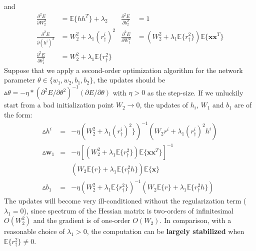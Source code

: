 \begin{comment}
\begin{align*}
\frac{\partial E}{\partial W_2}&=\mathbb{E}\{rh^T\}+\lambda_2W_2 
&\frac{\partial E}{\partial b_2}&=\mathbb{E}\{r\}
&\frac{\partial E}{\partial h^i}&=W_2r^i+\lambda_1(r^i_{\dagger})^2h^i\\
\frac{\partial E}{\partial W_1}&=W_2\mathbb{E}\{r\mathbf{x}^T\}+\lambda_1 \mathbb{E}\{r_{\dagger}^2h\mathbf{x}^T\}
&\frac{\partial E}{\partial b_1}&=W_2\mathbb{E}\{r\}+\lambda_1 \mathbb{E}\{r_{\dagger}^2h\}
\end{align*}
\end{comment}
and
\begin{align*}
\frac{\partial^2 E}{\partial W_2^2}&=\mathbb{E}\{hh^T\}+\lambda_2
&\frac{\partial^2 E}{\partial b_2^2}&=1\\
\frac{\partial^2 E}{\partial (h^i)^2}&=W_2^2+\lambda_1 (r^i_{\dagger})^2
&\frac{\partial^2 E}{\partial W_1^2}&=(W_2^2+\lambda_1 		\mathbb{E}\{r_{\dagger}^2\})\mathbb{E}\{\mathbf{x}\mathbf{x}^T\}\\
\frac{\partial^2 E}{\partial b_1^2}&=W_2^2+\lambda_1 \mathbb{E}\{r_{\dagger}^2\}
\end{align*}
Suppose that we apply a second-order optimization algorithm for the network parameter $\theta\in\{w_1,w_2,b_1,b_2\}$, the updates should be $\vartriangle\theta=-\eta*(\partial^2 E/\partial\theta^2)^{-1}(\partial E/\partial\theta)$ with $\eta>0$ as the step-size.
If we unluckily start from a bad initialization point $W_2\rightarrow0$, the updates of $h_i$, $W_1$ and $b_1$ are of the form:
\begin{eqnarray*}
\vartriangle h^i&=&-\eta(W_2^2+\lambda_1 (r^i_{\dagger})^2\})^{-1}(W_2r^i+\lambda_1(r^i_{\dagger})^2h^i)\\
	\vartriangle\mathbf{w}_1&=&-\eta[(W_2^2+\lambda_1\mathbb{E}\{ r_{\dagger}^2\})\mathbb{E}\{\mathbf{x}\mathbf{x}^T\}]^{-1}\\
	&&(W_2\mathbb{E}\{r\}+\lambda_1\mathbb{E}\{r_{\dagger}^2h\})\mathbb{E}\{\mathbf{x}\}\\
	\vartriangle b_1&=&-\eta(W_2^2+\lambda_1 \mathbb{E}\{r_{\dagger}^2\})^{-1}(W_2\mathbb{E}\{r\}+\lambda_1 \mathbb{E}\{r_{\dagger}^2h\})
\end{eqnarray*}
The updates will become very ill-conditioned without the regularization term ($\lambda_1=0$), since spectrum of the Hessian matrix is two-orders of infinitesimal $O(W_2^2)$ and the gradient is of one-order $O(W_2)$. In comparison, with a reasonable choice of $\lambda_1>0$, the computation can be \textbf{largely stabilized} when $\mathbb{E}\{r^2_\dagger\}\neq0$.

